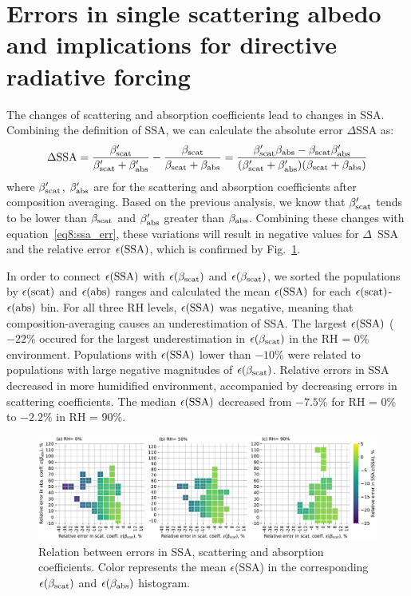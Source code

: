 \documentclass[edeposit,fullpage]{uiucthesis2009}
\begin{document}
\section{Errors in single scattering albedo and implications for directive radiative forcing}
\label{sec:ssa}
The changes of scattering and absorption coefficients lead to changes
in SSA. Combining the definition of SSA, we can calculate the absolute
error $\Delta$SSA as:
\begin{equation}{\label{eq8:ssa_err}}
\Delta {\rm SSA} = \frac{\beta_{\rm \rm scat}'}{\beta_{\rm \rm scat}' + \beta_{\rm \rm abs}'} - \frac{\beta_{\rm \rm scat}}{\beta_{\rm \rm scat} + \beta_{\rm \rm abs}} = \frac{\beta_{\rm \rm scat}'\beta_{\rm \rm abs} - \beta_{\rm \rm scat}\beta_{\rm \rm abs}'}{(\beta_{\rm \rm scat}' + \beta_{\rm \rm abs}')(\beta_{\rm \rm scat} + \beta_{\rm \rm abs})}
\end{equation}
where $\beta_{\rm scat}'$, $\beta_{\rm abs}'$ are for the scattering
and absorption coefficients after composition averaging. Based on the
previous analysis, we know that $\beta_{\rm scat}'$ tends to be lower
than $\beta_{\rm scat}$ and $\beta_{\rm abs}'$ greater than
$\beta_{\rm abs}$. Combining these changes with
equation~\ref{eq8:ssa_err}, these variations will result in negative
values for $\Delta$~SSA and the relative error $\epsilon(\rm SSA)$,
which is confirmed by Fig.~\ref{fig12:ssa-err}.


In order to connect $\epsilon(\rm SSA)$ with $\epsilon(\beta_{\rm
  scat})$ and $\epsilon(\beta_{\rm scat})$, we sorted the populations
by $\epsilon(\rm scat)$ and $\epsilon(\rm abs)$ ranges and calculated
the mean $\epsilon(\rm SSA)$ for each $\epsilon(\rm
scat)$-$\epsilon(\rm abs)$ bin. For all three RH levels, $\epsilon(\rm
SSA)$ was negative, meaning that composition-averaging causes an
underestimation of SSA. The largest $\epsilon(\rm SSA)$ ( $-22$\%
occured for the largest underestimation in $\epsilon(\beta_{\rm
  scat})$ in the RH = 0\% environment. Populations with $\epsilon(\rm
SSA)$ lower than $-10$\% were related to populations with large
negative magnitudes of $\epsilon(\beta_{\rm scat})$. Relative errors
in SSA decreased in more humidified environment, accompanied by
decreasing errors in scattering coefficients. The median $\epsilon(\rm
SSA)$ decreased from $-7.5$\% for RH = 0\% to $-2.2$\% in RH =
90\%. 

\begin{figure}
	\centering
	\includegraphics[scale=0.50]{chap4_figs/fig10.pdf}
	\caption{Relation between errors in SSA, scattering and
          absorption coefficients. Color represents the mean
          $\epsilon$(SSA) in the corresponding $\epsilon(\beta_{\rm
            scat})$ and $\epsilon(\beta_{\rm \rm abs})$ histogram.}
	\label{fig12:ssa-err}
\end{figure}
\end{document}
